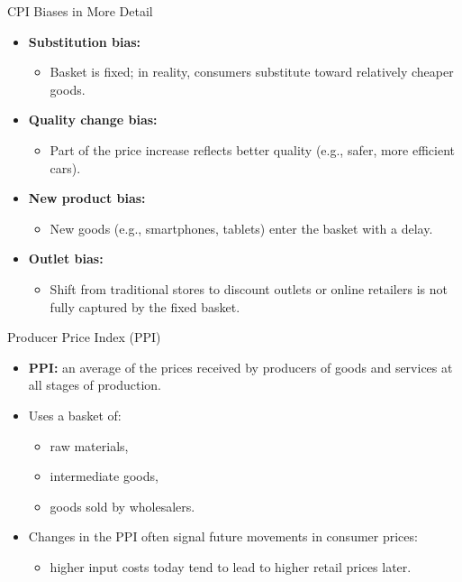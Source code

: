 \documentclass[aspectratio=169]{beamer}
\begin{document}
\begin{frame}{CPI Biases in More Detail}
\transfade
\begin{itemize}
  \item \textbf{Substitution bias:}
  \begin{itemize}
    \item Basket is fixed; in reality, consumers substitute toward relatively cheaper goods.
  \end{itemize}
  \item \textbf{Quality change bias:}
  \begin{itemize}
    \item Part of the price increase reflects better quality (e.g., safer, more efficient cars).
  \end{itemize}
  \item \textbf{New product bias:}
  \begin{itemize}
    \item New goods (e.g., smartphones, tablets) enter the basket with a delay.
  \end{itemize}
  \item \textbf{Outlet bias:}
  \begin{itemize}
    \item Shift from traditional stores to discount outlets or online retailers is not fully captured by the fixed basket.
  \end{itemize}
\end{itemize}
\end{frame}

\begin{frame}{Producer Price Index (PPI)}
\transfade
\begin{itemize}
  \item \textbf{PPI:} an average of the prices received by producers of goods and services at all stages of production.
  \item Uses a basket of:
  \begin{itemize}
    \item raw materials,
    \item intermediate goods,
    \item goods sold by wholesalers.
  \end{itemize}
  \item Changes in the PPI often signal future movements in consumer prices:
  \begin{itemize}
    \item higher input costs today tend to lead to higher retail prices later.
  \end{itemize}
\end{itemize}
\end{frame}
\end{document}
